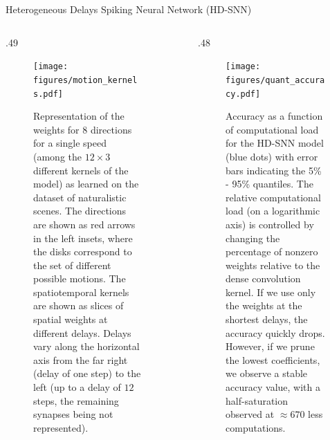 \documentclass[final]{beamer}
\newlength{\sepwidth}
\newlength{\colwidth}
\newcommand{\separatorcolumn}{\begin{column}{\sepwidth}\end{column}}
\begin{document}
\begin{frame}[t]
\begin{columns}[t]
\begin{column}{\colwidth}
\begin{block}{Heterogeneous Delays Spiking Neural Network (HD-SNN)~\parencite{Grimaldi23BC}}
\begin{columns}[t]
\begin{column}{.49\colwidth}
\begin{figure}
    {\centering
    \texttt{[image: figures/motion\_kernels.pdf]}
    }
    \caption{ \justifying 
    	Representation of the weights for $8$ directions for a single speed (among the $12 \times 3$ different kernels of the model) as learned on the dataset of naturalistic scenes. The directions are shown as red arrows in the left insets, where the disks correspond to the set of different possible motions. The spatiotemporal kernels are shown as slices of spatial weights at different delays. Delays vary along the horizontal axis from the far right (delay of one step) to the left (up to a delay of $12$ steps, the remaining synapses being not represented). %
	}
    \label{fig:kernels}
\end{figure} 
\end{column}
%
\separatorcolumn

\begin{column}{.48\colwidth}
\begin{figure}%
    \centering
    \texttt{[image: figures/quant\_accuracy.pdf]}
    \caption{\justifying 
        Accuracy as a function of computational load for the HD-SNN model (blue dots) with error bars indicating the 5\% - 95\% quantiles. The relative computational load (on a logarithmic axis) is controlled by changing the percentage of nonzero weights relative to the dense convolution kernel. If we use only the weights at the shortest delays, the accuracy quickly drops. However, if we prune the lowest coefficients, we observe a stable accuracy value, with a  half-saturation observed at $\approx 670$ less computations.
        }
    \label{fig:accuracy}
\end{figure}
\end{column}
\end{columns}


\end{block}
\end{column}
\end{columns}
\end{frame}
\end{document}
